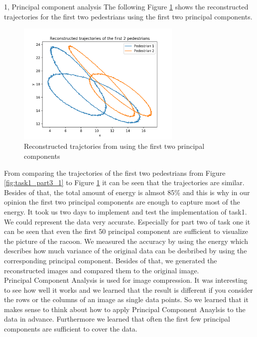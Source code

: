 \documentclass[10pt,a4paper]{article}
\begin{document}
\begin{task}{1, Principal component analysis}
The following Figure \ref{fig:task1_part3_2} shows the reconstructed trajectories for the first two pedestrians using the first two principal components.
\begin{figure}[H]
\centering
\includegraphics[width=0.7\textwidth]{../plots/task1/Task1_3reconstructed.png}
\caption{Reconstructed trajctories from using the first two principal components}
\label{fig:task1_part3_2}
\end{figure}
From comparing the trajectories of the first two pedestrians from Figure \ref{fig:task1_part3_1} to Figure \ref{fig:task1_part3_2} it can be seen that the trajectories are similar. Besides of that, the total amount of energy is almsot 85\% and this is why in our opinion the first two principal components are enough to capture most of the energy.
\bigbreak
It took us two days to implement and test the implementation of task1. \\We could represent the data very accurate. Especially for part two of task one it can be seen that even the first 50 principal component are sufficient to visualize the picture of the racoon. We measured the accuracy by using the energy which describes how much variance of the original data can be desbribed by using the corresponding principal component. Besides of that, we generated the reconstructed images and compared them to the original image. \\
Principal Component Analysis is used for image compression. It was interesting to see how well it works and we learned that the result is different if you consider the rows or the columns of an image as single data points. So we learned that it makes sense to think about how to apply Principal Component Anaylsis to the data in advance. Furthermore we learned that often the first few principal components are sufficient to cover the data. 
\end{task}
\end{document}
